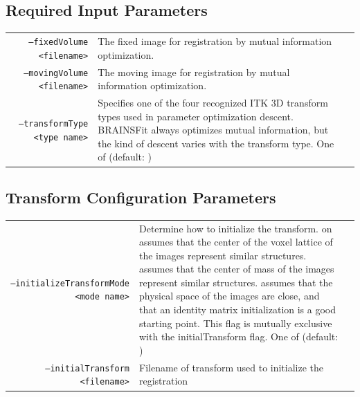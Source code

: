 \documentclass{InsightArticle}
\begin{document}
\subsection{Required Input Parameters}
\begin{tabular}{rp{0.15in}l}
\vspace{0.15in}\par
\texttt{--fixedVolume <filename>} & \parbox[t]{3.0in}{The fixed image for registration by mutual information optimization.} \\
\vspace{0.15in}\par
\texttt{--movingVolume <filename>} & \parbox[t]{3.0in}{The moving image for registration by mutual information optimization.} \\
\vspace{0.15in}\par
\texttt{--transformType <type name>} & \parbox[t]{3.0in}{Specifies one of the four recognized ITK 3D transform types used in parameter optimization descent.  BRAINSFit always optimizes mutual information, but the kind of descent varies with the transform type. One of   (default: )} \\
\end{tabular}
\subsection{Transform Configuration Parameters}
\begin{tabular}{rp{0.15in}l}
\vspace{0.15in}\par
\texttt{--initializeTransformMode <mode name>} & \parbox[t]{3.0in}{Determine how to initialize the transform.   on assumes that the center of the voxel lattice of the images represent similar structures.   assumes that the center of mass of the images represent similar structures.   assumes that the physical space of the images are close, and that an identity matrix initialization is a good starting point.  This flag is mutually exclusive with the initialTransform flag.  One of   (default: )} \\
\vspace{0.15in}\par
\texttt{--initialTransform <filename>} & \parbox[t]{3.0in}{Filename of transform used to initialize the registration} \\
\end{tabular}
\end{document}
